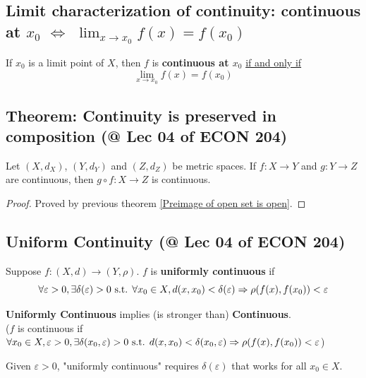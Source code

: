 \documentclass[11pt]{elegantbook}
\begin{document}
\subsection{Limit characterization of continuity: continuous at $x_0$ $\Leftrightarrow$ $\lim_{x \rightarrow x_0} f(x)=f(x_0)$}
\begin{theorem}
    If $x_0$ is a limit point of $X$, then $f$ is \textbf{continuous at $x_0$} \underline{if and only if}
    $$\lim_{x \rightarrow x_0} f(x)=f(x_0)$$
\end{theorem}

\subsection{Theorem: Continuity is preserved in composition \small{(@ Lec 04 of ECON 204)}}
\begin{theorem}
    Let $(X, d_X)$, $(Y, d_Y)$ and $(Z, d_Z)$ be metric spaces. If $f : X \rightarrow Y$ and $g : Y \rightarrow Z$ are continuous, then $g \circ f : X \rightarrow Z$ is
    continuous.
\end{theorem}
\begin{proof}
    Proved by previous theorem \ref{Preimage of open set is open}.
\end{proof}

\subsection{Uniform Continuity \small{(@ Lec 04 of ECON 204)}}
\begin{definition}
\normalfont
    Suppose $f : (X, d) \rightarrow (Y, \rho)$. $f$ is \textbf{uniformly continuous} if $$\forall \varepsilon>0, \exists \delta(\varepsilon)>0 \textnormal{ s.t. }\forall x_0\in X, d(x,x_0)<\delta(\varepsilon) \Rightarrow \rho(f(x), f(x_0))<\varepsilon$$
\end{definition}
\begin{claim}
    \textbf{Uniformly Continuous} implies (is stronger than) \textbf{Continuous}.\\
    ($f$ is continuous if $\forall x_0\in X, \varepsilon>0, \exists \delta(x_0,\varepsilon)>0 \textnormal{ s.t. } d(x,x_0)<\delta(x_0,\varepsilon) \Rightarrow \rho(f(x), f(x_0))<\varepsilon$)
\end{claim}
Given $\varepsilon>0$, "uniformly continuous" requires $\delta(\varepsilon)$ that works for all $x_0\in X$.
\end{document}
